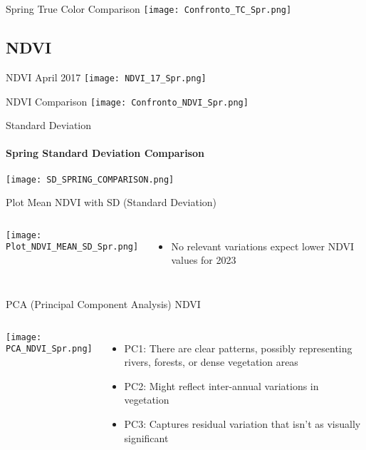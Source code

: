 \documentclass[10pt]{beamer}
\begin{document}
\begin{frame}{Spring True Color Comparison}
    \centering
    \texttt{[image: Confronto\_TC\_Spr.png]}  
\end{frame}

\subsection{NDVI}
\begin{frame}{NDVI April 2017}
    \centering
    \texttt{[image: NDVI\_17\_Spr.png]}  
    
\end{frame}

\begin{frame}{NDVI Comparison}
    \centering
    \texttt{[image: Confronto\_NDVI\_Spr.png]}
\end{frame}

\begin{frame}{Standard Deviation}
\framesubtitle{Spring Standard Deviation Comparison}
    \centering
    \texttt{[image: SD\_SPRING\_COMPARISON.png]}
\end{frame}


\begin{frame}{Plot Mean NDVI with SD (Standard Deviation)}
    \begin{columns}
                \texttt{[image: Plot\_NDVI\_MEAN\_SD\_Spr.png]}
            \begin{itemize}
                \item<1->No relevant variations expect lower NDVI values for 2023
            \end{itemize}
    \end{columns}
    
\end{frame}

\begin{frame}{PCA (Principal Component Analysis) NDVI}
    \begin{columns}
            \texttt{[image: PCA\_NDVI\_Spr.png]}

            \begin{itemize}
                \item PC1: There are clear patterns, possibly representing rivers, forests, or dense vegetation areas 
                \item PC2: Might reflect inter-annual variations in vegetation
                \item PC3: Captures residual variation that isn’t as visually significant
            \end{itemize}
    \end{columns}
    
\end{frame}
\end{document}
